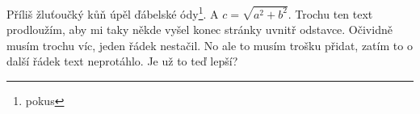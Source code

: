 \documentclass{article}
\begin{document}
Příliš žluťoučký kůň úpěl ďábelské ódy\footnote{pokus}. A $c=\sqrt{a^2+b^2}$. Trochu ten text prodloužím, aby mi taky někde vyšel konec stránky uvnitř odstavce. Očividně musím trochu víc, jeden řádek nestačil. No ale to musím trošku přidat, zatím to o další řádek text neprotáhlo. Je už to teď lepší? 
\blinddocument
\end{document}
